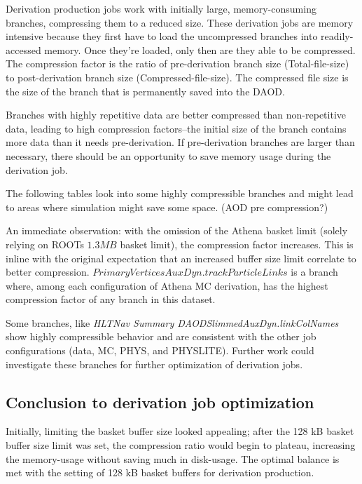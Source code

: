Derivation production jobs work with initially large, memory-consuming branches, compressing them to a reduced size. 
These derivation jobs are memory intensive because they first have to load the uncompressed branches into readily-accessed memory. 
Once they're loaded, only then are they able to be compressed. 
The compression factor is the ratio of pre-derivation branch size (Total-file-size) to post-derivation branch size (Compressed-file-size). 
The compressed file size is the size of the branch that is permanently saved into the DAOD.  

Branches with highly repetitive data are better compressed than non-repetitive data, leading to high compression factors--the initial size of the branch contains more data than it needs pre-derivation. 
If pre-derivation branches are larger than necessary, there should be an opportunity to save memory usage during the derivation job. 

The following tables look into some highly compressible branches and might lead to areas where simulation might save some space. (AOD pre compression?)





An immediate observation: with the omission of the Athena basket limit (solely relying on ROOTs $1.3 MB$ basket limit), the compression factor increases. 
This is inline with the original expectation that an increased buffer size limit correlate to better compression. 
$\textit{PrimaryVerticesAuxDyn.trackParticleLinks}$ is a branch where, among each configuration of Athena MC derivation, has the highest compression factor of any branch in this dataset. 

Some branches, like \textit{HLTNav Summary DAODSlimmedAuxDyn.linkColNames} show highly compressible behavior and are consistent with the other job configurations (data, MC, PHYS, and PHYSLITE). 
Further work could investigate these branches for further optimization of derivation jobs.

\subsection{Conclusion to derivation job optimization}
\label{sec:DAODProd_Results_conclusion}
Initially, limiting the basket buffer size looked appealing; after the 128 kB basket buffer size limit was set, the compression ratio would begin to plateau, increasing the memory-usage without saving much in disk-usage. 
The optimal balance is met with the setting of 128 kB basket buffers for derivation production. 

